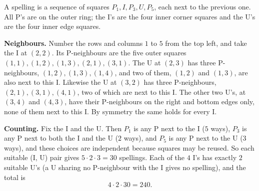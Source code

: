 A spelling is a sequence of squares $P_1,I,P_3,U,P_5$, each next to the previous one. All P's are on the outer ring; the I's are the four inner corner squares and the U's are the four inner edge squares.

\textbf{Neighbours.} Number the rows and columns $1$ to $5$ from the top left, and take the I at $(2,2)$. Its P-neighbours are the five outer squares $(1,1),(1,2),(1,3),(2,1),(3,1)$. The U at $(2,3)$ has three P-neighbours, $(1,2),(1,3),(1,4)$, and two of them, $(1,2)$ and $(1,3)$, are also next to this I. Likewise the U at $(3,2)$ has three P-neighbours, $(2,1),(3,1),(4,1)$, two of which are next to this I. The other two U's, at $(3,4)$ and $(4,3)$, have their P-neighbours on the right and bottom edges only, none of them next to this I. By symmetry the same holds for every I.

\textbf{Counting.} Fix the I and the U. Then $P_1$ is any P next to the I ($5$ ways), $P_3$ is any P next to both the I and the U ($2$ ways), and $P_5$ is any P next to the U ($3$ ways), and these choices are independent because squares may be reused. So each suitable (I, U) pair gives $5\cdot2\cdot3=30$ spellings. Each of the $4$ I's has exactly $2$ suitable U's (a U sharing no P-neighbour with the I gives no spelling), and the total is
\[4\cdot2\cdot30=\boxed{240}.\]
